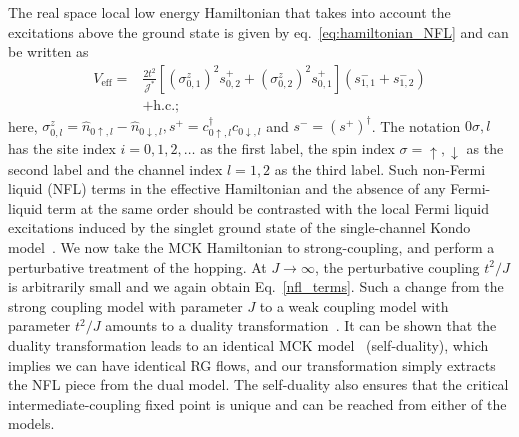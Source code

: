 \documentclass{iopart}
\begin{document}
The real space local low energy Hamiltonian that takes into account the excitations above the ground state is given by eq.~\ref{eq:hamiltonian_NFL} and can be written as
\begin{eqnarray}
	\label{nfl_terms}
	V_\mathrm{eff} =& \frac{2t^2}{{\mathcal{J}^*}}\left[\left(\sigma^z_{0,1}\right)^2 s^+_{0,2} + \left(\sigma^z_{0,2}\right)^2 s^+_{0,1}\right] \left(s^-_{1,1} + s^-_{1,2}\right) \nonumber\\
			&+ \mathrm{h.c.};
\end{eqnarray}
here, \(\sigma^z_{0,l} = \hat n_{0\uparrow,l} - \hat n_{0\downarrow,l}, s^+ = c^\dagger_{0 \uparrow,l}c_{0 \downarrow,l}\) and \(s^- = \left(s^+\right)^\dagger\). The notation \(0\sigma,l\) has the site index \(i=0,1,2,\ldots\) as the first label, the spin index \(\sigma=\uparrow,\downarrow\) as the second label and the channel index \(l=1,2\) as the third label.
Such non-Fermi liquid (NFL) terms in the effective Hamiltonian and the absence of any Fermi-liquid term at the same order should be contrasted with the local Fermi liquid excitations induced by the singlet ground state of the single-channel Kondo model~\cite{nozieres1974fermi,wilson1975renormalization,hewson1993}.
We now take the MCK Hamiltonian to strong-coupling, and perform a perturbative treatment of the hopping.
At \(J \to \infty\), the perturbative coupling \(t^2/J\) is arbitrarily small and we again obtain Eq.~\ref{nfl_terms}. Such a change from the strong coupling model with parameter \(J\) to a weak coupling model with parameter \(t^2/J\) amounts to a duality transformation~\cite{kroha_kolf_2007,zitko_fabrizio_2017}.
It can be shown that the duality transformation leads to an identical MCK model~\cite{kroha_kolf_2007} (self-duality), which implies we can have identical RG flows, and our transformation simply extracts the NFL piece from the dual model.
The self-duality also ensures that the critical intermediate-coupling fixed point is unique and can be reached from either of the models.
\end{document}
